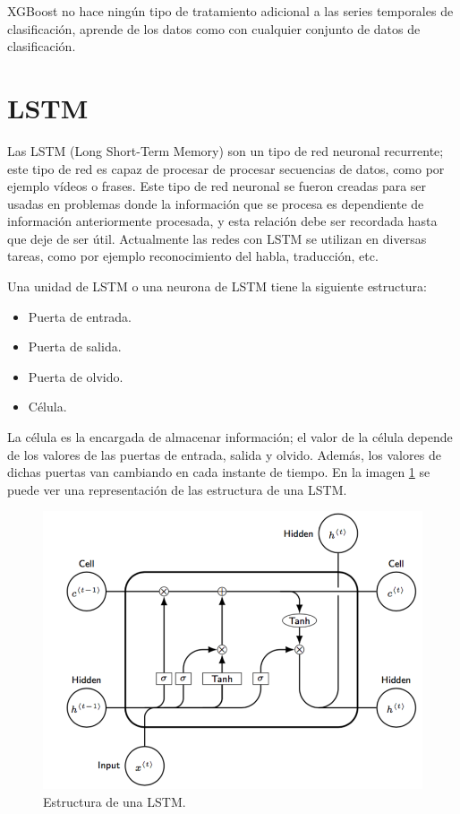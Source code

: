 XGBoost no hace ningún tipo de tratamiento adicional a las series temporales de clasificación, aprende de los datos como con cualquier conjunto de datos de clasificación.\newline

\newpage
\section{LSTM}
Las LSTM (Long Short-Term Memory) \cite{hochreiter1997long} son un tipo de red neuronal recurrente; este tipo de red es capaz de procesar de procesar secuencias de datos, como por ejemplo vídeos o frases. Este tipo de red neuronal se fueron creadas para ser usadas en problemas donde la información que se procesa es dependiente de información anteriormente procesada, y esta relación debe ser recordada hasta que deje de ser útil. Actualmente las redes con LSTM se utilizan en diversas tareas, como por ejemplo reconocimiento del habla, traducción, etc.\newline

Una unidad de LSTM o una neurona de LSTM tiene la siguiente estructura:
\begin{itemize}
	\item Puerta de entrada.
	\item Puerta de salida.
	\item Puerta de olvido.
	\item Célula.
\end{itemize}
\vspace{0.09in}
La célula es la encargada de almacenar información; el valor de la célula depende de los valores de las puertas de entrada, salida y olvido. Además, los valores de dichas puertas van cambiando en cada instante de tiempo. En la imagen \ref{fig:22} se puede ver una representación de las estructura de una LSTM.

\newpage

\begin{figure}[H]
	\centering
	\includegraphics[width=120mm]{imagenes/lstm-struct.png}
	\caption{Estructura de una LSTM.}
	\label{fig:22}
\end{figure}
\verticalspace

